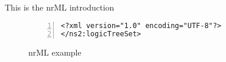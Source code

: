 This is the nrML introduction
%
\begin{figure}[!ht]
\small
\begin{Verbatim}[numbers=left,frame=single,fontsize=\small]
<?xml version="1.0" encoding="UTF-8"?>
</ns2:logicTreeSet>
\end{Verbatim}
\normalsize
\caption{nrML example}
\label{fig:nrMl_logic_tree_example}
\vspace*{1em}
\end{figure}
%
